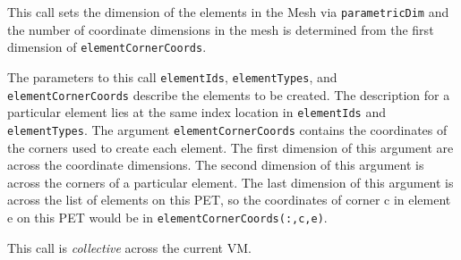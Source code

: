      This call sets the dimension of the elements in the Mesh
     via {\tt parametricDim} and the number of coordinate dimensions in the mesh
     is determined from the first dimension of {\tt elementCornerCoords}.
  
     The parameters to this call {\tt elementIds}, {\tt elementTypes}, and
     {\tt elementCornerCoords} describe the elements to be created. The description
     for a particular element lies at the same index location in {\tt elementIds}
     and {\tt elementTypes}. The argument {\tt elementCornerCoords} contains the coordinates of the
     corners used to create each element. The first dimension of this argument are across the coordinate dimensions.
     The second dimension of this argument is across the corners of a
     particular element. The last dimension of this argument is across the list
     of elements on this PET, so the coordinates of corner c in element e on this PET
     would be in {\tt elementCornerCoords(:,c,e)}.
  
     This call is {\em collective} across the current VM.
  
